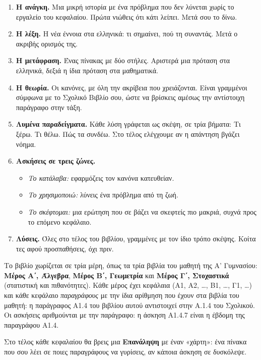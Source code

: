 \begin{enumerate}[leftmargin=2em,itemsep=0.5ex]
\item \textbf{Η ανάγκη.} Μια μικρή ιστορία με ένα πρόβλημα που δεν λύνεται χωρίς το εργαλείο του κεφαλαίου. Πρώτα νιώθεις ότι κάτι λείπει. Μετά σου το δίνω.
\item \textbf{Η λέξη.} Η νέα έννοια στα ελληνικά: τι σημαίνει, πού τη συναντάς. Μετά ο ακριβής ορισμός της.
\item \textbf{Η μετάφραση.} Ένας πίνακας με δύο στήλες. Αριστερά μια πρόταση στα ελληνικά, δεξιά η ίδια πρόταση στα μαθηματικά.
\item \textbf{Η θεωρία.} Οι κανόνες, με όλη την ακρίβεια που χρειάζονται. Είναι γραμμένοι σύμφωνα με το Σχολικό Βιβλίο σου, ώστε να βρίσκεις αμέσως την αντίστοιχη παράγραφο στην τάξη.
\item \textbf{Λυμένα παραδείγματα.} Κάθε λύση γράφεται ως σκέψη, σε τρία βήματα: Τι ξέρω. Τι θέλω. Πώς τα συνδέω. Στο τέλος ελέγχουμε αν η απάντηση βγάζει νόημα.
\item \textbf{Ασκήσεις σε τρεις ζώνες.}
  \begin{itemize}[leftmargin=1.2em,itemsep=0.2ex]
  \item \emph{Το κατάλαβα:} εφαρμόζεις τον κανόνα κατευθείαν.
  \item \emph{Το χρησιμοποιώ:} λύνεις ένα πρόβλημα από τη ζωή.
  \item \emph{Το σκέφτομαι:} μια ερώτηση που σε βάζει να σκεφτείς πιο μακριά, συχνά προς το επόμενο κεφάλαιο.
  \end{itemize}
\item \textbf{Λύσεις.} Όλες στο τέλος του βιβλίου, γραμμένες με τον ίδιο τρόπο σκέψης. Κοίτα τες αφού προσπαθήσεις, όχι πριν.
\end{enumerate}

Το βιβλίο χωρίζεται σε τρία μέρη, όπως τα τρία βιβλία του μαθητή της Α’ Γυμνασίου: \textbf{Μέρος Α΄, Άλγεβρα}, \textbf{Μέρος Β΄, Γεωμετρία} και \textbf{Μέρος Γ΄, Στοχαστικά} (στατιστική και πιθανότητες). Κάθε μέρος έχει κεφάλαια (Α1, Α2, …, Β1, …, Γ1, …) και κάθε κεφάλαιο \emph{παραγράφους} με την ίδια αρίθμηση που έχουν στα βιβλία του μαθητή: η παράγραφος Α1.4 του βιβλίου αυτού αντιστοιχεί στην Α.1.4 του Σχολικού. Οι ασκήσεις αριθμούνται με την παράγραφο: η άσκηση Α1.4.7 είναι η έβδομη της παραγράφου Α1.4.

Στο τέλος κάθε κεφαλαίου θα βρεις μια \textbf{Επανάληψη} με έναν «χάρτη»: ένα πίνακα που σου λέει σε ποιες παραγράφους να γυρίσεις, αν κάποια άσκηση σε δυσκόλεψε.

